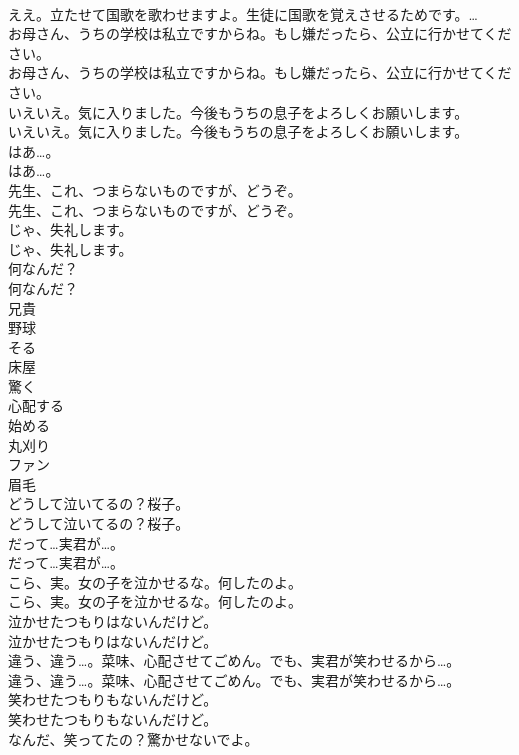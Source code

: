 \documentclass[8pt]{extreport}
\begin{document}
\begin{CJK}{UTF8}{min}
\\	ええ。立たせて国歌を歌わせますよ。生徒に国歌を覚えさせるためです。… 
\\	お母さん、うちの学校は私立ですからね。もし嫌だったら、公立に行かせてください。	
\\	お母さん、うちの学校は私立ですからね。もし嫌だったら、公立に行かせてください。 
\\	いえいえ。気に入りました。今後もうちの息子をよろしくお願いします。	
\\	いえいえ。気に入りました。今後もうちの息子をよろしくお願いします。 
\\	はあ…。	
\\	はあ…。 
\\	先生、これ、つまらないものですが、どうぞ。	
\\	先生、これ、つまらないものですが、どうぞ。 
\\	じゃ、失礼します。	
\\	じゃ、失礼します。 
\\	何なんだ？	
\\	何なんだ？ 
\\	兄貴
\\	野球
\\	そる
\\	床屋
\\	驚く
\\	心配する
\\	始める
\\	丸刈り
\\	ファン
\\	眉毛
\\	どうして泣いてるの？桜子。	
\\	どうして泣いてるの？桜子。 
\\	だって…実君が…。	
\\	だって…実君が…。 
\\	こら、実。女の子を泣かせるな。何したのよ。	
\\	こら、実。女の子を泣かせるな。何したのよ。 
\\	泣かせたつもりはないんだけど。	
\\	泣かせたつもりはないんだけど。 
\\	違う、違う…。菜味、心配させてごめん。でも、実君が笑わせるから…。	
\\	違う、違う…。菜味、心配させてごめん。でも、実君が笑わせるから…。 
\\	笑わせたつもりもないんだけど。	
\\	笑わせたつもりもないんだけど。 
\\	なんだ、笑ってたの？驚かせないでよ。	

\end{CJK}
\end{document}
